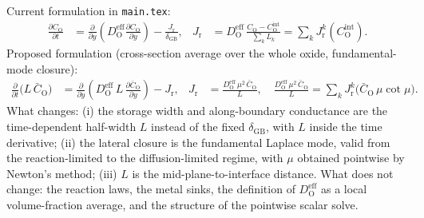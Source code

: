 \documentclass[12pt]{article}
\newcommand{\GB}{\mathrm{GB}}
\newcommand{\eff}{\mathrm{eff}}
\newcommand{\intf}{\mathrm{int}}
\newcommand{\Ox}{\mathrm{O}}
\newcommand{\D}{D_{\Ox}^{\eff}}
\newcommand{\Cb}{\bar{C}_{\Ox}}
\newcommand{\Ci}{C_{\Ox}^{\intf}}
\newcommand{\Jr}{J_{\mathrm{r}}}
\begin{document}
Current formulation in \texttt{main.tex}:
\begin{align}
\frac{\partial C_{\Ox}}{\partial t}
 &=\frac{\partial}{\partial y}\!\left(\D\frac{\partial C_{\Ox}}{\partial y}\right)
   -\frac{\Jr}{\delta_{\GB}}, &
\Jr &=\D\,\frac{C_{\Ox}-\Ci}{\sum_k L_k}=\sum_k\Jr^{k}(\Ci).
\end{align}
Proposed formulation (cross-section average over the whole oxide, fundamental-mode
closure):
\begin{align}
\frac{\partial}{\partial t}\bigl(L\,\Cb\bigr)
 &=\frac{\partial}{\partial y}\!\left(\D\,L\,\frac{\partial\Cb}{\partial y}\right)-\Jr, &
\Jr &=\frac{\D\,\mu^{2}\,\Cb}{L},\quad
\frac{\D\,\mu^{2}\,\Cb}{L}=\sum_k\Jr^{k}\!\bigl(\Cb\,\mu\cot\mu\bigr).
\end{align}
What changes: (i) the storage width and along-boundary conductance are the
time-dependent half-width $L$ instead of the fixed $\delta_{\GB}$, with $L$ inside the
time derivative; (ii) the lateral closure is the fundamental Laplace mode, valid from
the reaction-limited to the diffusion-limited regime, with $\mu$ obtained pointwise
by Newton's method; (iii) $L$ is the mid-plane-to-interface distance. What does not
change: the reaction laws, the metal sinks, the definition of $\D$ as a local
volume-fraction average, and the structure of the pointwise scalar solve.
\end{document}
